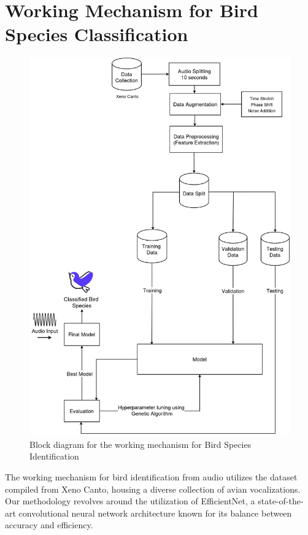 \section{Working Mechanism for Bird Species Classification}
       \begin{figure}[h!]
            \centering
            \includegraphics[scale=0.33]{images/MajorProject-Audio Methodology.png}
            \caption{Block diagram for the working mechanism for Bird Species Identification}%
        \end{figure}
        The working mechanism for bird identification from audio utilizes the dataset
        compiled from Xeno Canto, housing a diverse collection of avian vocalizations.
        Our methodology revolves around the utilization of EfficientNet, a
        state-of-the-art convolutional neural network architecture known for its
        balance between accuracy and efficiency.

